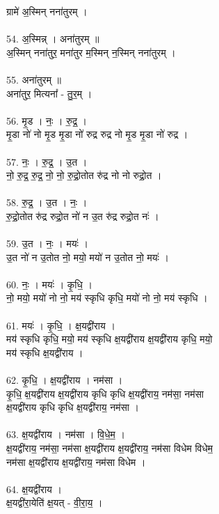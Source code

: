 ग्रामे॑ अ॒स्मिन् नना॑तुरम् ।\\
\\
54. अ॒स्मिन्न् । अना॑तुरम् ॥\\
अ॒स्मिन् नना॑तुर॒ मना॑तुर म॒स्मिन् न॒स्मिन् नना॑तुरम् ।\\
\\
55. अना॑तुरम् ॥\\
अना॑तुर॒ मित्यना᳚ - तु॒र॒म् ।\\
\\
56. मृ॒ड । नः॒ । रु॒द्र॒ ।\\
मृ॒डा नो॑ नो मृ॒ड मृ॒डा नो॑ रुद्र रुद्र नो मृ॒ड मृ॒डा नो॑ रुद्र ।\\
\\
57. नः॒ । रु॒द्र॒ । उ॒त ।\\
नो॒ रु॒द्र॒ रु॒द्र॒ नो॒ नो॒ रु॒द्रो॒तोत रु॑द्र नो नो रुद्रो॒त ।\\
\\
58. रु॒द्र॒ । उ॒त । नः॒ ।\\
रु॒द्रो॒तोत रु॑द्र रुद्रो॒त नो॑ न उ॒त रु॑द्र रुद्रो॒त नः॑ ।\\
\\
59. उ॒त । नः॒ । मयः॑ ।\\
उ॒त नो॑ न उ॒तोत नो॒ मयो॒ मयो॑ न उ॒तोत नो॒ मयः॑ ।\\
\\
60. नः॒ । मयः॑ । कृ॒धि॒ ।\\
नो॒ मयो॒ मयो॑ नो नो॒ मय॑ स्कृधि कृधि॒ मयो॑ नो नो॒ मय॑ स्कृधि ।\\
\\
61. मयः॑ । कृ॒धि॒ । क्ष॒यद्वी॑राय ।\\
मय॑ स्कृधि कृधि॒ मयो॒ मय॑ स्कृधि क्ष॒यद्वी॑राय क्ष॒यद्वी॑राय कृधि॒ मयो॒\\
मय॑ स्कृधि क्ष॒यद्वी॑राय ।\\
\\
62. कृ॒धि॒ । क्ष॒यद्वी॑राय । नम॑सा ।\\
कृ॒धि॒ क्ष॒यद्वी॑राय क्ष॒यद्वी॑राय कृधि कृधि क्ष॒यद्वी॑राय॒ नम॑सा॒ नम॑सा\\
क्ष॒यद्वी॑राय कृधि कृधि क्ष॒यद्वी॑राय॒ नम॑सा ।\\
\\
63. क्ष॒यद्वी॑राय । नम॑सा । वि॒धे॒म॒ ।\\
क्ष॒यद्वी॑राय॒ नम॑सा॒ नम॑सा क्ष॒यद्वी॑राय क्ष॒यद्वी॑राय॒ नम॑सा विधेम विधेम॒\\
नम॑सा क्ष॒यद्वी॑राय क्ष॒यद्वी॑राय॒ नम॑सा विधेम ।\\
\\
64. क्ष॒यद्वी॑राय ।\\
क्ष॒यद्वी॑रा॒येति॑ क्ष॒यत् - वी॒रा॒य॒ ।\\
